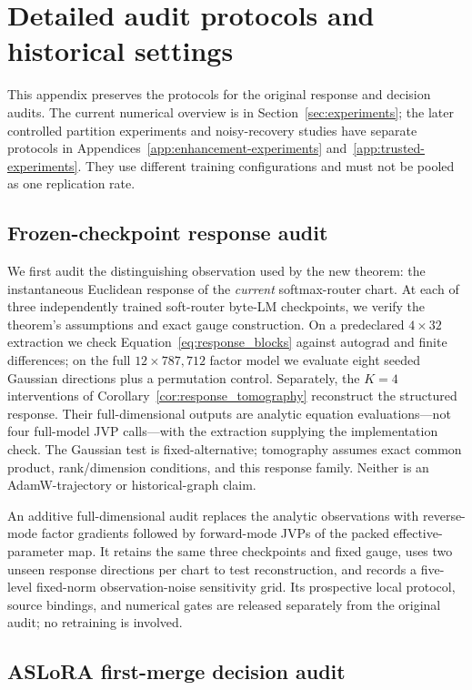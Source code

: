 \section{Detailed audit protocols and historical settings}
\label{sec:benchmark}

This appendix preserves the protocols for the original response and
decision audits. The current numerical overview is in
Section~\ref{sec:experiments}; the later controlled partition experiments and
noisy-recovery studies have separate protocols in
Appendices~\ref{app:enhancement-experiments} and~\ref{app:trusted-experiments}.
They use different training configurations and must not be pooled as one
replication rate.

\subsection{Frozen-checkpoint response audit}

We first audit the distinguishing observation used by the new theorem: the
instantaneous Euclidean response of the \emph{current} softmax-router chart.
At each of three independently trained soft-router byte-LM checkpoints, we
verify the theorem's assumptions and exact gauge construction.  On a
predeclared $4\times32$ extraction we check
Equation~\ref{eq:response_blocks} against autograd and finite differences; on
the full $12\times787{,}712$ factor model we evaluate eight seeded Gaussian
directions plus a permutation control.  Separately, the $K=4$ interventions of
Corollary~\ref{cor:response_tomography} reconstruct the structured response.
Their full-dimensional outputs are analytic equation evaluations---not four
full-model JVP calls---with the extraction supplying the implementation check.
The Gaussian test is fixed-alternative; tomography assumes exact common
product, rank/dimension conditions, and this response family.  Neither is an
AdamW-trajectory or historical-graph claim.

An additive full-dimensional audit replaces the analytic observations with
reverse-mode factor gradients followed by forward-mode JVPs of the packed
effective-parameter map. It retains the same three checkpoints and fixed
gauge, uses two unseen response directions per chart to test reconstruction,
and records a five-level fixed-norm observation-noise sensitivity grid.
Its prospective local protocol, source bindings, and numerical gates are
released separately from the original audit; no retraining is involved.

\subsection{ASLoRA first-merge decision audit}
\label{sec:aslora-protocol}

